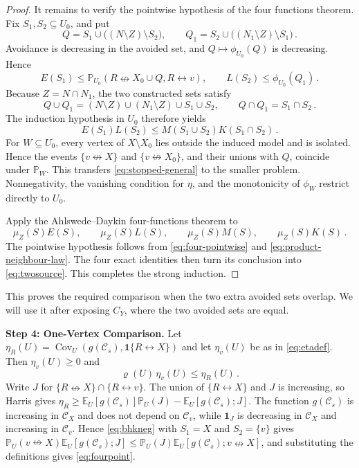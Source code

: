 \documentclass[11pt]{article}
\theoremstyle{definition}
\theoremstyle{remark}
\newcommand{\PP}{\mathbb P}
\newcommand{\EE}{\mathbb E}
\newcommand{\one}{\mathbf 1}
\newcommand{\con}{\leftrightarrow}
\newcommand{\ncon}{\nleftrightarrow}
\newcommand{\eC}{\mathcal C}
\DeclareMathOperator{\Cov}{Cov}
\begin{document}
\begin{proof}
It remains to verify the pointwise hypothesis of the four functions theorem. Fix
$S_1,S_2\subseteq U_0$, and put
\[
 Q=S_1\cup\bigl((N\setminus Z)\setminus S_2\bigr),\qquad
 Q_1=S_2\cup\bigl((N_1\setminus Z)\setminus S_1\bigr)\,.
\]
Avoidance is decreasing in the avoided set, and $Q\mapsto\phi_{U_0}(Q)$ is decreasing.
Hence
\[
 E(S_1)\leq\PP_{U_0}(R\ncon X_0\cup Q,R\con v),
 \qquad L(S_2)\leq\phi_{U_0}(Q_1)\,.
\]
Because $Z=N\cap N_1$, the two constructed sets satisfy
\[
 Q\cup Q_1=(N\setminus Z)\cup(N_1\setminus Z)\cup S_1\cup S_2,
 \qquad Q\cap Q_1=S_1\cap S_2\,.
\]
The induction hypothesis in $U_0$ therefore yields
\begin{equation}\label{eq:four-pointwise}
 E(S_1)L(S_2)\leq M(S_1\cup S_2)K(S_1\cap S_2)\,.
\end{equation}
For $W\subseteq U_0$, every vertex of $X\setminus X_0$ lies outside the induced model and
is isolated. Hence the events $\{v\ncon X\}$ and $\{v\ncon X_0\}$, and their unions with
$Q$, coincide under $\PP_W$. This transfers \eqref{eq:stopped-general} to the smaller
problem. Nonnegativity, the vanishing condition for $\eta$, and the monotonicity of
$\phi_W$ restrict directly to $U_0$.

Apply the Ahlswede--Daykin four-functions theorem to
\[
 \mu_Z(S)E(S),\qquad \mu_Z(S)L(S),\qquad
 \mu_Z(S)M(S),\qquad \mu_Z(S)K(S)\,.
\]
The pointwise hypothesis follows from \eqref{eq:four-pointwise} and
\eqref{eq:product-neighbour-law}. The four exact identities then turn its conclusion into
\eqref{eq:twosource}. This completes the strong induction.
\end{proof}

This proves the required comparison when the two extra avoided sets overlap. We will use
it after exposing $C_Y$, where the two avoided sets are equal.

\medskip\noindent\textbf{Step 4: One-Vertex Comparison.}
Let $\eta_R(U)=\Cov_U(g(\eC_s),\one\{R\con X\})$ and let $\eta_v(U)$ be as in
\eqref{eq:etadef}. Then $\eta_v(U)\geq0$ and
\begin{equation}\label{eq:fourpoint}
 \varrho(U)\,\eta_v(U)\leq \eta_R(U)\,.
\end{equation}
Write $J$ for $\{R\ncon X\}\cap\{R\con v\}$. The union of $\{R\con X\}$ and $J$ is
increasing, so Harris gives $\eta_R\geq\EE_U[g(\eC_s)]\PP_U(J)-\EE_U[g(\eC_s);J]$. The
function $g(\eC_s)$ is increasing in $\eC_X$ and does not depend on $\eC_v$, while $\one_J$
is decreasing in $\eC_X$ and increasing in $\eC_v$. Hence \eqref{eq:bhkneg} with $S_1=X$ and
$S_2=\{v\}$ gives $\PP_U(v\ncon X)\EE_U[g(\eC_s);J]\leq\PP_U(J)\EE_U[g(\eC_s);v\ncon X]$,
and substituting the definitions gives \eqref{eq:fourpoint}.
\end{document}
